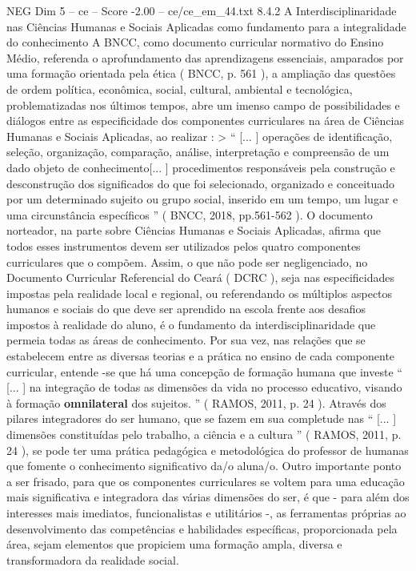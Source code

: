 \begin{textsample}{NEG Dim 5 – ce – Score -2.00 – ce/ce\_em\_44.txt}  \label{ex:f5_neg_035}
8.4.2 A Interdisciplinaridade nas Ciências Humanas e Sociais Aplicadas como fundamento para a integralidade do conhecimento A BNCC, como documento curricular normativo do Ensino Médio, referenda o aprofundamento das aprendizagens essenciais, amparados por uma formação orientada pela ética ( BNCC, p. 561 ), a ampliação das questões de ordem política, econômica, social, cultural, ambiental e tecnológica, problematizadas nos últimos tempos, abre um imenso campo de possibilidades e diálogos entre as especificidade dos componentes curriculares na área de Ciências Humanas e Sociais Aplicadas, ao realizar : > “ [... ] operações de identificação, seleção, organização, comparação, análise, interpretação e compreensão de um dado objeto de conhecimento[... ] procedimentos responsáveis pela construção e desconstrução dos significados do que foi selecionado, organizado e conceituado por um determinado sujeito ou grupo social, inserido em um tempo, um lugar e uma circunstância específicos ” ( BNCC, 2018, pp.561-562 ).
O documento norteador, na parte sobre Ciências Humanas e Sociais Aplicadas, afirma que todos esses instrumentos devem ser utilizados pelos quatro componentes curriculares que o compõem.
Assim, o que não pode ser negligenciado, no Documento Curricular Referencial do Ceará ( DCRC ), seja nas especificidades impostas pela realidade local e regional, ou referendando os múltiplos aspectos humanos e sociais do que deve ser aprendido na escola frente aos desafios impostos à realidade do aluno, é o fundamento da interdisciplinaridade que permeia todas as áreas de conhecimento.
Por sua vez, nas relações que se estabelecem entre as diversas teorias e a prática no ensino de cada componente curricular, entende -se que há uma concepção de formação humana que investe “ [... ] na integração de todas as dimensões da vida no processo educativo, visando à formação \textbf{omnilateral} dos sujeitos. ” ( RAMOS, 2011, p. 24 ).
Através dos pilares integradores do ser humano, que se fazem em sua completude nas “ [... ] dimensões constituídas pelo trabalho, a ciência e a cultura ” ( RAMOS, 2011, p. 24 ), se pode ter uma prática pedagógica e metodológica do professor de humanas que fomente o conhecimento significativo da/o aluna/o.
Outro importante ponto a ser frisado, para que os componentes curriculares se voltem para uma educação mais significativa e integradora das várias dimensões do ser, é que - para além dos interesses mais imediatos, funcionalistas e utilitários -, as ferramentas próprias ao desenvolvimento das competências e habilidades específicas, proporcionada pela área, sejam elementos que propiciem uma formação ampla, diversa e transformadora da realidade social.

\end{textsample}

